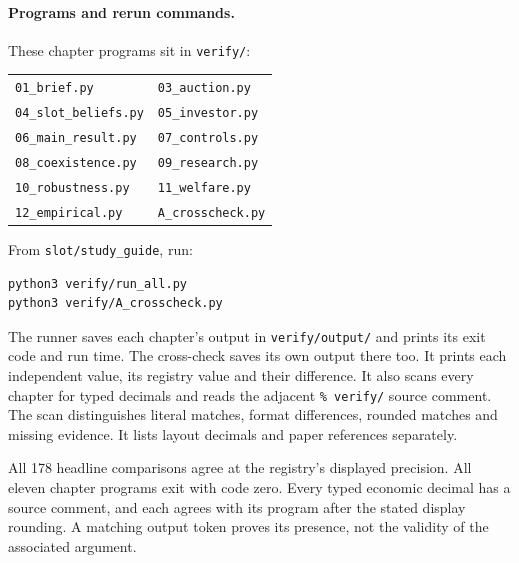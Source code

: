 \paragraph{Programs and rerun commands.}
These chapter programs sit in \texttt{verify/}:
\begin{center}
\small
\begin{tabular}{@{}ll@{}}
\texttt{01\_brief.py} & \texttt{03\_auction.py}\\
\texttt{04\_slot\_beliefs.py} & \texttt{05\_investor.py}\\
\texttt{06\_main\_result.py} & \texttt{07\_controls.py}\\
\texttt{08\_coexistence.py} & \texttt{09\_research.py}\\
\texttt{10\_robustness.py} & \texttt{11\_welfare.py}\\
\texttt{12\_empirical.py} & \texttt{A\_crosscheck.py}\\
\end{tabular}
\end{center}
From \texttt{slot/study\_guide}, run:
\begin{verbatim}
python3 verify/run_all.py
python3 verify/A_crosscheck.py
\end{verbatim}
The runner saves each chapter's output in \texttt{verify/output/} and prints its exit code and run time.
The cross-check saves its own output there too.
It prints each independent value, its registry value and their difference.
It also scans every chapter for typed decimals and reads the adjacent \texttt{\% verify/} source comment.
The scan distinguishes literal matches, format differences, rounded matches and missing evidence.
It lists layout decimals and paper references separately.

\begin{resultbox}
All 178 headline comparisons agree at the registry's displayed precision.
All eleven chapter programs exit with code zero.
Every typed economic decimal has a source comment, and each agrees with its program after the stated display
rounding.
A matching output token proves its presence, not the validity of the associated argument.
\end{resultbox}
